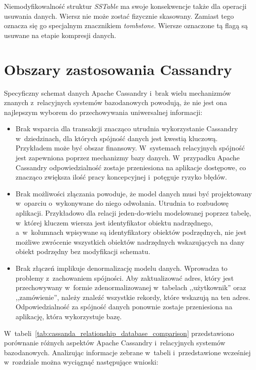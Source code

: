 Niemodyfikowalność struktur \emph{SSTable} ma swoje konsekwencje także dla operacji usuwania danych. Wiersz nie może zostać fizycznie skasowany. Zamiast tego oznacza się go specjalnym znacznikiem \emph{tombstone}. Wiersze oznaczone tą flagą są usuwane na etapie kompresji danych.

\section{Obszary zastosowania Cassandry}
\label{sec:cassandra_usage_areas}

Specyficzny schemat danych Apache Cassandry i~brak wielu mechanizmów znanych z~relacyjnych systemów bazodanowych powodują, że nie jest ona najlepszym wyborem do przechowywania uniwersalnej informacji:

\begin{itemize}
	\item Brak wsparcia dla transakcji znacząco utrudnia wykorzystanie Cassandry w~dziedzinach, dla których spójność danych jest kwestią kluczową. Przykładem może być obszar finansowy. W~systemach relacyjnych spójność jest zapewniona poprzez mechanizmy bazy danych. W~przypadku Apache Cassandry odpowiedzialność zostaje przeniesiona na aplikacje dostępowe, co znacząco zwiększa ilość pracy koncepcyjnej i~potęguje ryzyko błędów.
	\item Brak możliwości złączania powoduje, że model danych musi być projektowany w~oparciu o~wykonywane do niego odwołania. Utrudnia to rozbudowę aplikacji. Przykładowo dla relacji jeden-do-wielu modelowanej poprzez tabelę, w~której kluczem wiersza jest identyfikator obiektu nadrzędnego, a~w~kolumnach wpisywane są identyfikatory obiektów podrzędnych, nie jest możliwe zwrócenie wszystkich obiektów nadrzędnych wskazujących na dany obiekt podrzędny bez modyfikacji schematu.
	\item Brak złączeń implikuje denormalizację modelu danych. Wprowadza to problemy z~zachowaniem spójności. Aby zaktualizować adres, który jest przechowywany w~formie zdenormalizowanej w~tabelach ,,użytkownik'' oraz ,,zamówienie'', należy znaleźć wszystkie rekordy, które wskazują na ten adres. Odpowiedzialność za spójność danych ponownie zostaje przeniesiona na aplikację, która wykorzystuje bazę.
\end{itemize}

W~tabeli~\ref{tab:cassanda_relationship_database_comparison} przedstawiono porównanie różnych aspektów Apache Cassandry i~relacyjnych systemów bazodanowych. Analizując informacje zebrane w~tabeli i~przedstawione wcześniej w~rozdziale można wyciągnąć następujące wnioski:

